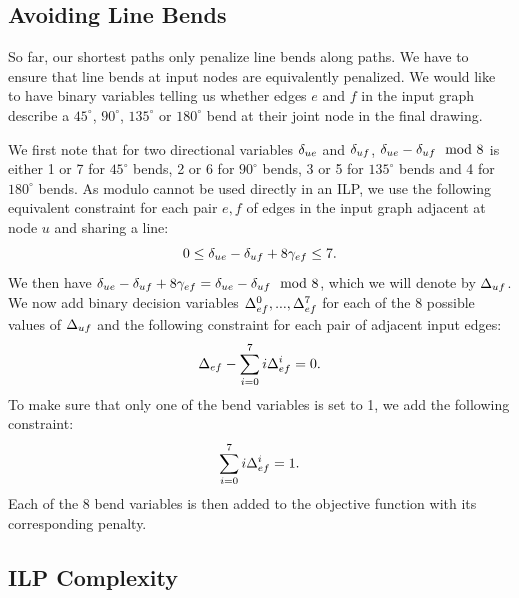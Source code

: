 \documentclass[sigconf]{acmart}
\begin{document}
\subsection{Avoiding Line Bends}

So far, our shortest paths only penalize line bends along paths.
We have to ensure that line bends at input nodes are equivalently penalized.
We would like to have binary variables telling us whether edges $e$ and $f$ in the input graph describe a $45^{\circ}$, $90^{\circ}$, $135^{\circ}$ or $180^{\circ}$ bend at their joint node in the final drawing.

We first note that for two directional variables $\delta_{ue}$ and $\delta_{uf}$, $\delta_{ue} - \delta_{uf} \mod 8$ is either 1 or 7 for $45^\circ$ bends, 2 or 6 for $90^\circ$ bends, 3 or 5 for $135^\circ$ bends and 4 for $180^\circ$ bends.
As modulo cannot be used directly in an ILP, we use the following equivalent constraint for each pair $e, f$ of edges in the input graph adjacent at node $u$ and sharing a line:
%
\begin{equation} 
  0 \leq \delta_{ue} - \delta_{uf} + 8 \gamma_{ef} \leq 7 \label{EQ:dirneg}.
\end{equation}
%
We then have $\delta_{ue} - \delta_{uf} + 8 \gamma_{ef} = \delta_{ue} - \delta_{uf} \mod 8$, which we will denote by $\Delta_{uf}$.
We now add binary decision variables $\Delta_{ef}^{0}, ..., \Delta_{ef}^{7}$ for each of the 8 possible values of $\Delta_{uf}$ and the following constraint for each pair of adjacent input edges:
%
\begin{equation} 
  \Delta_{ef} - \sum_{i = 0}^7 i\Delta_{ef}^{i} = 0 \label{EQ:bendassign}.
\end{equation}
%
To make sure that only one of the bend variables is set to 1, we add the following constraint:
%
\begin{equation} 
  \sum_{i = 0}^7 i\Delta_{ef}^{i} = 1 \label{EQ:bendsum}.
\end{equation}
%
Each of the 8 bend variables is then added to the objective function with its corresponding penalty.

\subsection{ILP Complexity}
\end{document}
